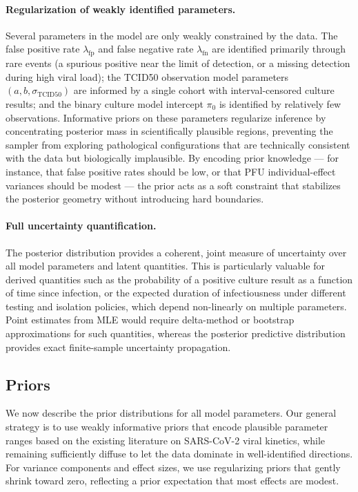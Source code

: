 \documentclass[12pt]{article}
\begin{document}
\paragraph{Regularization of weakly identified parameters.} Several parameters in the model are only weakly constrained by the data. The false positive rate $\lambda_{\text{fp}}$ and false negative rate $\lambda_{\text{fn}}$ are identified primarily through rare events (a spurious positive near the limit of detection, or a missing detection during high viral load); the TCID50 observation model parameters $(a, b, \sigma_{\text{TCID50}})$ are informed by a single cohort with interval-censored culture results; and the binary culture model intercept $\pi_0$ is identified by relatively few observations. Informative priors on these parameters regularize inference by concentrating posterior mass in scientifically plausible regions, preventing the sampler from exploring pathological configurations that are technically consistent with the data but biologically implausible. By encoding prior knowledge --- for instance, that false positive rates should be low, or that PFU individual-effect variances should be modest --- the prior acts as a soft constraint that stabilizes the posterior geometry without introducing hard boundaries.

\paragraph{Full uncertainty quantification.} The posterior distribution provides a coherent, joint measure of uncertainty over all model parameters and latent quantities. This is particularly valuable for derived quantities such as the probability of a positive culture result as a function of time since infection, or the expected duration of infectiousness under different testing and isolation policies, which depend non-linearly on multiple parameters. Point estimates from MLE would require delta-method or bootstrap approximations for such quantities, whereas the posterior predictive distribution provides exact finite-sample uncertainty propagation.

\subsection{Priors} \label{sec:priors}

We now describe the prior distributions for all model parameters. Our general strategy is to use weakly informative priors that encode plausible parameter ranges based on the existing literature on SARS-CoV-2 viral kinetics, while remaining sufficiently diffuse to let the data dominate in well-identified directions. For variance components and effect sizes, we use regularizing priors that gently shrink toward zero, reflecting a prior expectation that most effects are modest.
\end{document}
